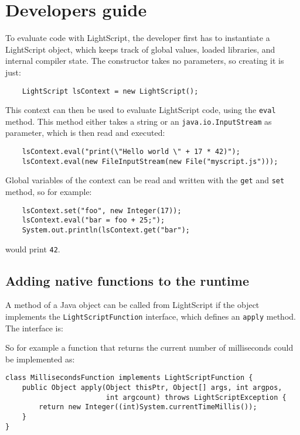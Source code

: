 \documentclass[11pt]{report}
\begin{document}



\section{Developers guide}
To evaluate code with LightScript, the developer first has to instantiate a LightScript object, which keeps track of global values, loaded libraries, and internal compiler state. The constructor takes no parameters, so creating it is just:
\begin{lstlisting}
    LightScript lsContext = new LightScript();
\end{lstlisting}
This context can then be used to evaluate LightScript code, using the \verb|eval| method. This method either takes a string or an \verb|java.io.InputStream| as parameter, which is then read and executed:
\begin{lstlisting}
    lsContext.eval("print(\"Hello world \" + 17 * 42)");
    lsContext.eval(new FileInputStream(new File("myscript.js")));
\end{lstlisting}
Global variables of the context can be read and written with the \verb|get| and \verb|set| method, so for example:
\begin{lstlisting}
    lsContext.set("foo", new Integer(17));
    lsContext.eval("bar = foo + 25;");
    System.out.println(lsContext.get("bar");
\end{lstlisting}
would print \verb|42|.

\subsection{Adding native functions to the runtime}

A method of a Java object can be called from LightScript if the object implements the \verb|LightScriptFunction| interface, which defines an \verb|apply| method.
The interface is:

So for example a function that returns the current number of milliseconds could be implemented as:
\begin{lstlisting}
class MillisecondsFunction implements LightScriptFunction {
    public Object apply(Object thisPtr, Object[] args, int argpos, 
                        int argcount) throws LightScriptException {
        return new Integer((int)System.currentTimeMillis());
    }
}
\end{lstlisting}
\end{document}
